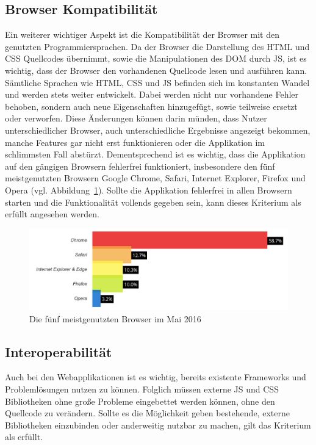 \subsection{Browser Kompatibilität}
\label{sec:muster_browser_kompatibilitaet}
Ein weiterer wichtiger Aspekt ist die Kompatibilität der Browser mit den genutzten Programmiersprachen. Da der Browser die Darstellung des \ac{HTML} und \ac{CSS} Quellcodes übernimmt, sowie die Manipulationen des DOM durch \ac{JS}, ist es wichtig, dass der Browser den vorhandenen Quellcode lesen und ausführen kann. Sämtliche Sprachen wie \ac{HTML}, \ac{CSS} und \ac{JS} befinden sich im konstanten Wandel und werden stets weiter entwickelt.
Dabei werden nicht nur vorhandene Fehler behoben, sondern auch neue Eigenschaften hinzugefügt, sowie teilweise ersetzt oder verworfen. Diese Änderungen können darin münden, dass Nutzer unterschiedlicher Browser, auch unterschiedliche Ergebnisse angezeigt bekommen, manche Features gar nicht erst funktionieren oder die Applikation im schlimmsten Fall abstürzt. Dementsprechend ist es wichtig, dass die Applikation auf den gängigen Browsern fehlerfrei funktioniert, insbesondere den fünf meistgenutzten Browsern Google Chrome, Safari, Internet Explorer, Firefox und Opera (vgl. Abbildung~\ref{fig:browser-may-2016}). Sollte die Applikation fehlerfrei in allen Browsern starten und die Funktionalität vollends gegeben sein, kann dieses Kriterium als erfüllt angesehen werden.

\begin{figure}[hb]
  \centering  
  \includegraphics[scale=0.3]{img/browser_2016.png}
  \caption{Die fünf meistgenutzten Browser im Mai 2016 \cite{top-five-browser-statistics}}\label{fig:browser-may-2016}
\end{figure}

\subsection{Interoperabilität}
\label{sec:muster_interoperabilitaet}
Auch bei den Webapplikationen ist es wichtig, bereits existente Frameworks und Problemlösungen nutzen zu können. Folglich müssen externe \ac{JS} und \ac{CSS} Bibliotheken ohne große Probleme eingebettet werden können, ohne den Quellcode zu verändern. Sollte es die Möglichkeit geben bestehende, externe Bibliotheken einzubinden oder anderweitig nutzbar zu machen, gilt das Kriterium als erfüllt.


